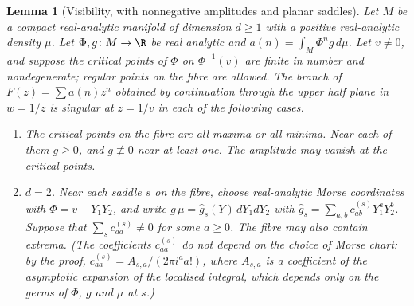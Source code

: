 \documentclass[11pt,a4paper]{article}
\newtheorem{lemma}[theorem]{Lemma}
\theoremstyle{definition}
\theoremstyle{remark}
\numberwithin{equation}{section}
\begin{document}
\begin{lemma}[Visibility, with nonnegative amplitudes and planar saddles]\label{B:F:lem:vis}
Let $M$ be a compact real-analytic manifold of dimension $d\ge1$ with a
positive real-analytic density $\mu$. Let $\Phi,g\colon M\to\R$ be real
analytic and $a(n)=\int_M\Phi^n g\,d\mu$. Let $v\ne0$, and suppose the
critical points of $\Phi$ on $\Phi^{-1}(v)$ are finite in number and
nondegenerate; regular points on the fibre are allowed. The branch of
$F(z)=\sum a(n)z^n$ obtained by continuation through the upper half plane
in $w=1/z$ is singular at $z=1/v$ in each of the following cases.
\begin{enumerate}
\item[(a)] The critical points on the fibre are all maxima or all minima.
Near each of them $g\ge0$, and $g\not\equiv0$ near at least one. The
amplitude may vanish at the critical points.
\item[(b)] $d=2$. Near each saddle $s$ on the fibre, choose real-analytic
Morse coordinates with $\Phi=v+Y_1Y_2$, and write
$g\,\mu=\widehat g_s(Y)\,dY_1dY_2$ with
$\widehat g_s=\sum_{a,b}c^{(s)}_{ab}Y_1^aY_2^b$. Suppose that
$\sum_s c^{(s)}_{aa}\ne0$ for some $a\ge0$. The fibre may also contain
extrema. (The coefficients $c^{(s)}_{aa}$ do not depend on the choice of Morse
chart: by the proof, $c^{(s)}_{aa}=A_{s,a}/(2\pi i^a a!)$, where $A_{s,a}$ is a
coefficient of the asymptotic expansion of the localised integral, which
depends only on the germs of $\Phi$, $g$ and $\mu$ at $s$.)
\end{enumerate}
\end{lemma}
\end{document}
